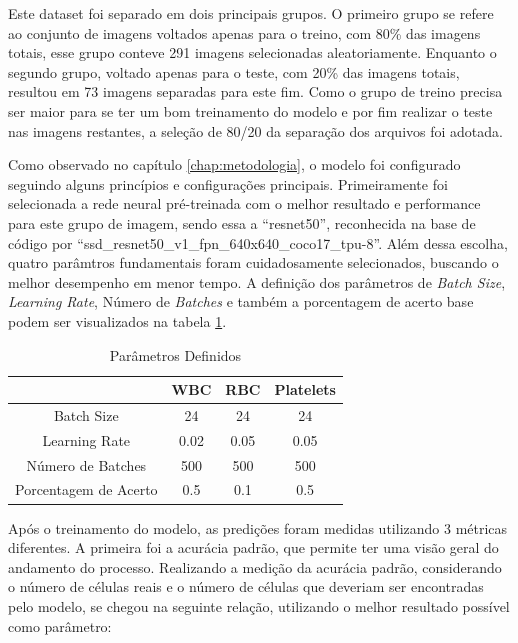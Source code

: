 Este dataset foi separado em dois principais grupos. O primeiro grupo se refere ao conjunto de imagens voltados apenas para o treino, com 80\% das imagens totais, esse grupo conteve 291 imagens selecionadas aleatoriamente. Enquanto o segundo grupo, voltado apenas para o teste, com 20\% das imagens totais, resultou em 73 imagens separadas para este fim. Como o grupo de treino precisa ser maior para se ter um bom treinamento do modelo e por fim realizar o teste nas imagens restantes, a seleção de 80/20 da separação dos arquivos foi adotada.

Como observado no capítulo \ref{chap:metodologia}, o modelo foi configurado seguindo alguns princípios e configurações principais. Primeiramente foi selecionada a rede neural pré-treinada com o melhor resultado e performance para este grupo de imagem, sendo essa a ``resnet50'', reconhecida na base de código por ``ssd\_resnet50\_v1\_fpn\_640x640\_coco17\_tpu-8''. Além dessa escolha, quatro parâmtros fundamentais foram cuidadosamente selecionados, buscando o melhor desempenho em menor tempo. A definição dos parâmetros de \emph{Batch Size}, \emph{Learning Rate}, Número de \emph{Batches} e também a porcentagem de acerto base podem ser visualizados na tabela \ref{tbl:parametros}.

\begin{table}[!htb]
\centering
\caption{Parâmetros Definidos}
\label{tbl:parametros}
\begin{tabular}{|c|c|c|c|}
\hline
                      & WBC  & RBC  & Platelets \\ \hline
Batch Size            & 24   & 24   & 24        \\ \hline
Learning Rate         & 0.02 & 0.05 & 0.05      \\ \hline
Número de Batches     & 500  & 500  & 500       \\ \hline
Porcentagem de Acerto & 0.5 & 0.1 & 0.5      \\ \hline
\end{tabular}
	\vspace{6pt}
\end{table}

Após o treinamento do modelo, as predições foram medidas utilizando 3 métricas diferentes. A primeira foi a acurácia padrão, que permite ter uma visão geral do andamento do processo. Realizando a medição da acurácia padrão, considerando o número de células reais e o número de células que deveriam ser encontradas pelo modelo, se chegou na seguinte relação, utilizando o melhor resultado possível como parâmetro:

